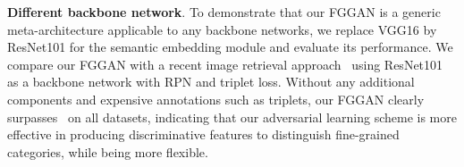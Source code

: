 \documentclass[runningheads]{llncs}
\begin{document}
\begin{comment}
\begin{table*}[t]
\renewcommand{\arraystretch}{0.95}
	\centering
    \vspace{-2mm}
    \footnotesize
	\caption{Performance comparison (mAP, \%) of using ResNet101 as the backbone network.}
	\label{tbl:map-compare-resnet}
    \vspace{-2mm}{
	\begin{tabular*}{\textwidth}{@{}@{\extracolsep{\fill}}lcccc|cccc|ccc@{}}
	& \multicolumn{3}{c}{CompCars} && \multicolumn{3}{c}{eBayCamera10k} && \multicolumn{3}{c}{Lookbook} \\
	\hline
	Method  & $k = 5$ &  $k = 10$ & $k = 20$ && $k = 5$ &  $k = 10$ & $k = 20$ && $k = 5$ &  $k = 10$ & $k = 20$\\ 
    \hline
    ResNet101~\cite{he2016deep} & $59.54$ & $55.87$ & $49.82$ && $83.61$ & $80.82$ & $77.85$ && $65.74$ & $62.27$ & $57.80$\\
    RPN$+$TripletLoss~\cite{gordo2017end} & $78.65$ & $73.32$ & $65.52$ && $86.44$ & $83.30$ & $78.88$ && $71.89$ & $68.96$ & $65.58$\\
	FGGAN$_{ResNet101}$& $\textbf{81.99}$ & $\textbf{76.65}$ & $\textbf{68.83}$ && $\textbf{95.68}$ & $\textbf{94.89}$ & $\textbf{94.06}$ && $\textbf{87.68}$ & $\textbf{83.02}$ & $\textbf{78.63}$\\
	\hline
	\end{tabular*}
    }
\end{table*}
\end{comment}{\flushleft \textbf{Different backbone network}.} To demonstrate that our FGGAN is a generic meta-architecture applicable to any backbone networks, we replace VGG16 by ResNet101 for the semantic embedding module and evaluate its performance. We compare our FGGAN with a recent image retrieval approach~\cite{gordo2017end} using ResNet101 as a backbone network with RPN and triplet loss. Without any additional components and expensive annotations such as triplets, our FGGAN clearly surpasses~\cite{gordo2017end} on all datasets, indicating that our adversarial learning scheme is more effective in producing discriminative features to distinguish fine-grained categories, while being more flexible. 
\end{document}
